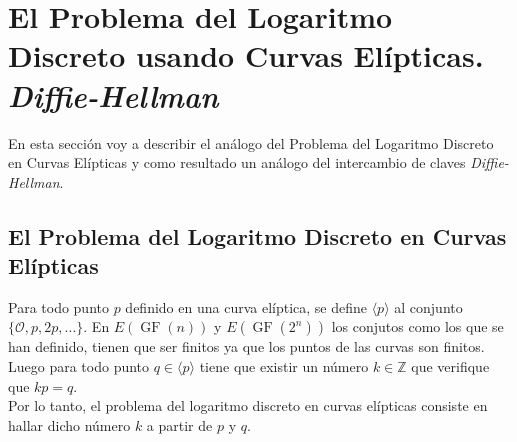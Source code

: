 \section{El Problema del Logaritmo Discreto usando Curvas Elípticas. \emph{Diffie-Hellman}}
En esta sección voy a describir el análogo del Problema del Logaritmo Discreto en Curvas Elípticas y como resultado un análogo del intercambio de claves \emph{Diffie-Hellman}.

\subsection{El Problema del Logaritmo Discreto en Curvas Elípticas}
Para todo punto $p$ definido en una curva elíptica, se define $\langle p\rangle$ al conjunto $\{\mathcal{O}, p, 2p, ... \}$.
En $E(\operatorname{GF}(n))$ y $E(\operatorname{GF}(2^n))$ los conjutos como los que se han definido, tienen que ser finitos ya que los puntos de las curvas son finitos. Luego para todo punto $q\in \langle p\rangle$ tiene que existir un número $k \in \mathbb{Z}$ que verifique que $kp=q$.\\
Por lo tanto, el problema del logaritmo discreto en curvas elípticas consiste en hallar dicho número $k$ a partir de $p$ y $q$.
